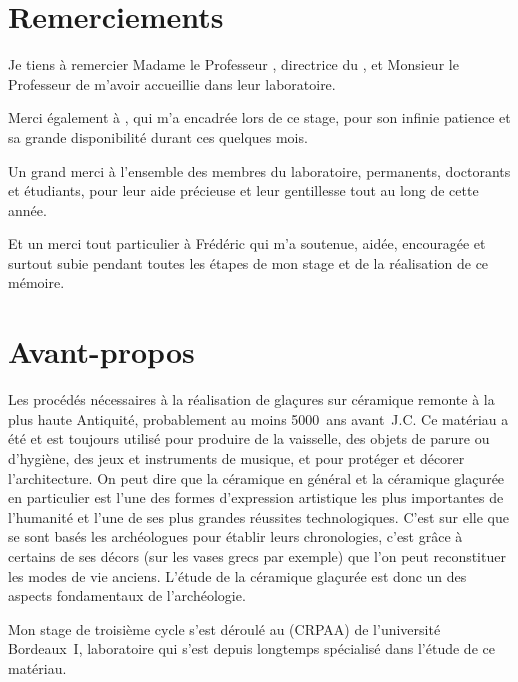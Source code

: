 
\chapter{Remerciements}

Je tiens à remercier Madame le Professeur \FB, directrice du \CRPAA, 
et Monsieur le Professeur \MS de m'avoir accueillie dans leur 
laboratoire.

\bigskip

Merci également à \ABA, qui m'a encadrée lors de ce stage, pour son 
infinie patience et sa grande disponibilité durant ces quelques mois.

\bigskip

Un grand merci à l'ensemble des membres du laboratoire, permanents, 
doctorants et étudiants, pour leur aide précieuse et leur gentillesse 
tout au long de cette année.

\bigskip

Et un merci tout particulier à Frédéric qui m'a soutenue, aidée, 
encouragée et surtout subie pendant toutes les étapes de mon stage 
et de la réalisation de ce mémoire.

\chapter{Avant-propos}

Les procédés nécessaires à la réalisation de glaçures sur céramique 
remonte à la plus haute Antiquité, probablement au moins 
\num{5000}~ans avant~J.C. Ce matériau a été et est toujours utilisé 
pour produire de la vaisselle, des objets de parure ou d'hygiène, 
des jeux et instruments de musique, et pour protéger et décorer 
l'architecture. On peut dire que la céramique en général et la 
céramique glaçurée en particulier est l'une des formes d'expression 
artistique les plus importantes de l'humanité et l'une de ses plus 
grandes réussites technologiques. C'est sur elle que se sont basés les 
archéologues pour établir leurs chronologies, c'est grâce à certains 
de ses décors (sur les vases grecs par exemple) que l'on peut 
reconstituer les modes de vie anciens. L'étude de la céramique 
glaçurée est donc un des aspects fondamentaux de l'archéologie.


Mon stage de troisième cycle s'est déroulé au \CRPAA (CRPAA) de 
l'université Bordeaux~I, laboratoire qui s'est depuis longtemps 
spécialisé dans l'étude de ce matériau.

